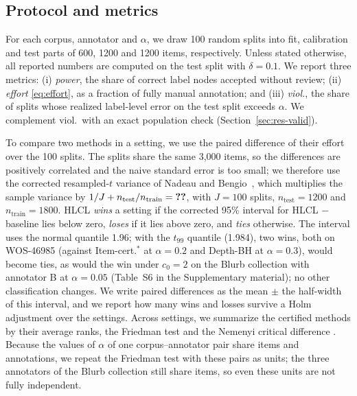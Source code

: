 \documentclass[preprint,12pt]{elsarticle}
\theoremstyle{definition}
\newcommand{\hlcl}{\textup{\textsc{HLCL}}}
\begin{document}
\subsection{Protocol and metrics}
\label{sec:setup-proto}

For each corpus, annotator and $\alpha$, we draw 100 random splits into fit,
calibration and test parts of 600, 1200 and 1200 items, respectively. Unless
stated otherwise, all
reported numbers are computed on the test split with $\delta=0.1$. We report
three metrics: (i) \emph{power}, the share of correct label nodes accepted
without review; (ii) \emph{effort} \eqref{eq:effort}, as a fraction of fully
manual annotation; and (iii) \emph{viol.}, the share of splits whose realized
label-level error on the test split exceeds $\alpha$. We complement viol.\ with
an exact population check (Section~\ref{sec:res-valid}).

To compare two methods in a setting, we use the paired difference of their
effort over the 100 splits. The splits share the same 3,000 items, so the
differences are positively correlated and the naive standard error is too small;
we therefore use the corrected resampled-$t$ variance of
Nadeau and Bengio~\cite{nadeau2003inference}, which multiplies the sample variance by
$1/J+n_{\mathrm{test}}/n_{\mathrm{train}}=\stat{s@nbfactor}$, with $J=100$
splits, $n_{\mathrm{test}}=1200$ and $n_{\mathrm{train}}=1800$. \hlcl{}
\emph{wins} a setting if the corrected 95\% interval for \hlcl{} $-$ baseline
lies below zero, \emph{loses} if it lies above zero, and \emph{ties} otherwise.
The interval uses the normal quantile 1.96; with the $t_{99}$ quantile (1.984),
two wins, both on WOS-46985 (against Item-cert.$^\ast$ at $\alpha=0.2$ and
Depth-BH at $\alpha=0.3$), would become ties, as would the win under $c_0=2$ on
the Blurb collection with annotator B at $\alpha=0.05$ (Table~S6 in the Supplementary material);
no other classification changes. We write paired differences as the mean $\pm$ the
half-width of this interval, and we report how many wins and losses survive a
Holm adjustment over the  settings. Across
settings, we summarize the certified methods by their average ranks, the
Friedman test and the Nemenyi critical difference \citep{demsar2006statistical}.
Because the values of $\alpha$ of one corpus--annotator pair share items and
annotations, we repeat the Friedman test with these pairs as units; the
three annotators of the Blurb collection still share items, so even these units
are not fully independent.
\end{document}
